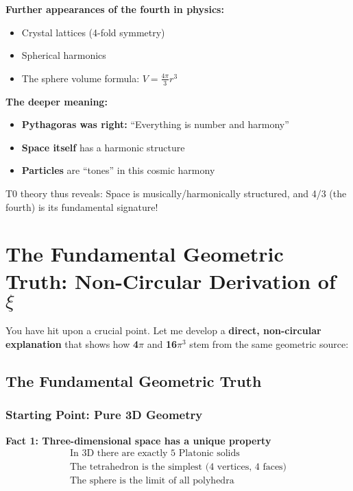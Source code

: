 \documentclass[12pt,a4paper]{article}
\begin{document}
\textbf{Further appearances of the fourth in physics:}
\begin{itemize}
	\item Crystal lattices (4-fold symmetry)
	\item Spherical harmonics
	\item The sphere volume formula: $V = \frac{4\pi}{3}r^3$
\end{itemize}

\textbf{The deeper meaning:}
\begin{itemize}
	\item \textbf{Pythagoras was right:} ``Everything is number and harmony''
	\item \textbf{Space itself} has a harmonic structure
	\item \textbf{Particles} are ``tones'' in this cosmic harmony
\end{itemize}

T0 theory thus reveals: Space is musically/harmonically structured, and 4/3 (the fourth) is its fundamental signature!

\section{The Fundamental Geometric Truth: Non-Circular Derivation of $\xi$}
\label{sec:fundamental_geometric_truth}

You have hit upon a crucial point. Let me develop a \textbf{direct, non-circular explanation} that shows how \textbf{4$\pi$} and \textbf{16$\pi^3$} stem from the same geometric source:

\subsection{The Fundamental Geometric Truth}
\label{subsec:fundamental_truth}

\subsubsection{Starting Point: Pure 3D Geometry}
\label{subsubsec:pure_3d_geometry}

\textbf{Fact 1: Three-dimensional space has a unique property}
\begin{align}
	\text{In 3D there are exactly 5 Platonic solids} \nonumber \\
	\text{The tetrahedron is the simplest (4 vertices, 4 faces)} \nonumber \\
	\text{The sphere is the limit of all polyhedra} \nonumber
\end{align}
\end{document}
